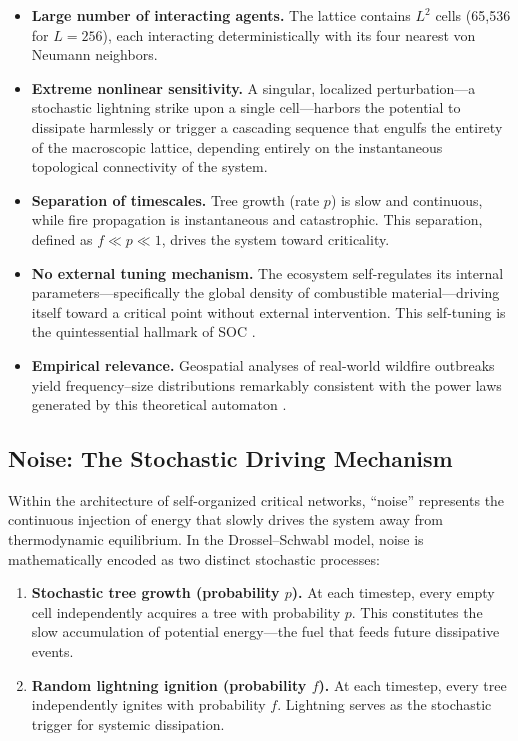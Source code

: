 \documentclass[12pt, a4paper]{article}
\begin{document}
\begin{itemize}
    \item \textbf{Large number of interacting agents.} The lattice contains $L^2$ cells (65,536 for $L = 256$), each interacting deterministically with its four nearest von Neumann neighbors.
    \item \textbf{Extreme nonlinear sensitivity.} A singular, localized perturbation---a stochastic lightning strike upon a single cell---harbors the potential to dissipate harmlessly or trigger a cascading sequence that engulfs the entirety of the macroscopic lattice, depending entirely on the instantaneous topological connectivity of the system.
    \item \textbf{Separation of timescales.} Tree growth (rate $p$) is slow and continuous, while fire propagation is instantaneous and catastrophic. This separation, defined as $f \ll p \ll 1$, drives the system toward criticality.
    \item \textbf{No external tuning mechanism.} The ecosystem self-regulates its internal parameters---specifically the global density of combustible material---driving itself toward a critical point without external intervention. This self-tuning is the quintessential hallmark of SOC \citep{bak1987}.
    \item \textbf{Empirical relevance.} Geospatial analyses of real-world wildfire outbreaks yield frequency--size distributions remarkably consistent with the power laws generated by this theoretical automaton \citep{malamud1998}.
\end{itemize}

\subsection{Noise: The Stochastic Driving Mechanism}

Within the architecture of self-organized critical networks, ``noise'' represents the continuous injection of energy that slowly drives the system away from thermodynamic equilibrium. In the Drossel--Schwabl model, noise is mathematically encoded as two distinct stochastic processes:

\begin{enumerate}
    \item \textbf{Stochastic tree growth (probability $p$).} At each timestep, every empty cell independently acquires a tree with probability $p$. This constitutes the slow accumulation of potential energy---the fuel that feeds future dissipative events.
    \item \textbf{Random lightning ignition (probability $f$).} At each timestep, every tree independently ignites with probability $f$. Lightning serves as the stochastic trigger for systemic dissipation.
\end{enumerate}
\end{document}
